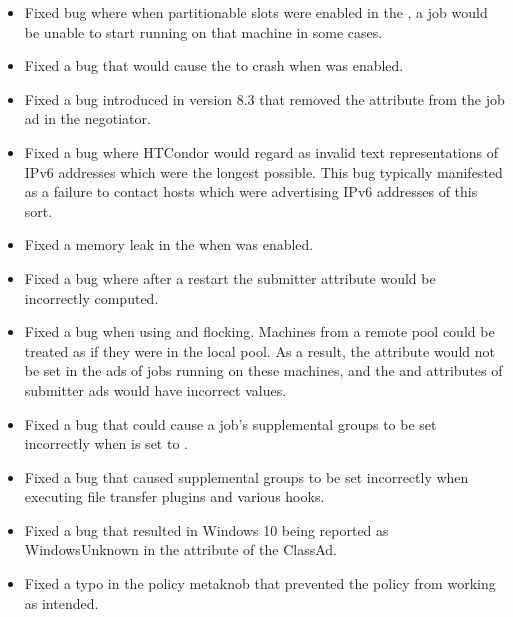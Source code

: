 \begin{itemize}

\item Fixed bug where when partitionable slots were
enabled in the , a job would be unable
to start running on that machine in some cases.

\item Fixed a bug that would cause the 
to crash when  was enabled.

\item Fixed a bug introduced in version 8.3 that
removed the attribute 
from the job ad in the negotiator.

\item Fixed a bug where HTCondor would regard as invalid text representations
of IPv6 addresses which were the longest possible.  This bug typically
manifested as a failure to contact hosts which were advertising IPv6 addresses
of this sort.

\item Fixed a memory leak in the  when
 was enabled.

\item Fixed a bug where after a  restart
the submitter attribute 
would be incorrectly computed.

\item Fixed a bug when using 
and flocking.
Machines from a remote pool could be treated as if they were in the local
pool.
As a result, the  attribute would not be set in the ads
of jobs running on these machines, and the  and
 attributes of submitter ads would have incorrect
values.

\item Fixed a bug that could cause a job's supplemental groups to be set
incorrectly when  is set to .

\item Fixed a bug that caused supplemental groups to be set incorrectly
when executing file transfer plugins and various hooks.

\item Fixed a bug that resulted in Windows 10 being reported as
WindowsUnknown in the  attribute of the 
ClassAd.

\item Fixed a typo in the  policy metaknob
that prevented the policy from working as intended.

\end{itemize}

